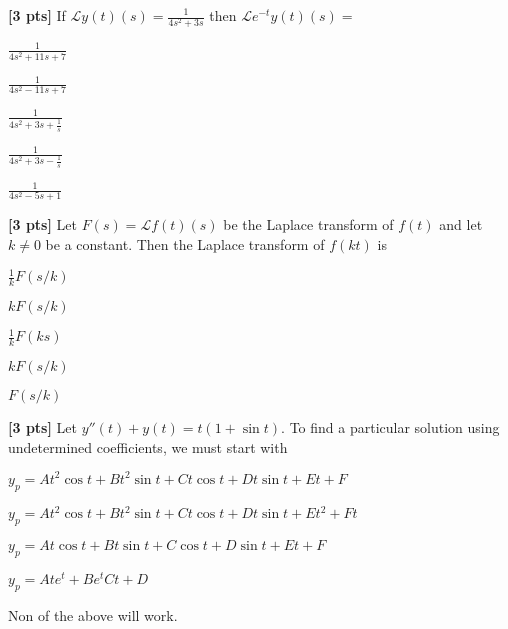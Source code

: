 \documentclass[11pt]{article}
\begin{document}
\begin{problem}
\textbf{[3 pts]} If $\mathcal{L}{y(t)}(s) = \frac{1}{4s^{2}+3s}$ then $\mathcal{L}{e^{-t}y(t)}(s)=$
\begin{multchoice}
     \item $\frac{1}{4s^{2}+11s+7}$
     \item $\frac{1}{4s^{2}-11s+7}$
     \item $\frac{1}{4s^{2}+3s+\frac{1}{s}}$
     \item $\frac{1}{4s^{2}+3s-\frac{1}{s}}$
     \item $\frac{1}{4s^{2}-5s+1}$
\end{multchoice}
\end{problem}



\begin{problem}
\textbf{[3 pts]} Let $F(s) = \mathcal{L}{f(t)}(s)$ be the Laplace transform of $f (t)$ and let $k \neq 0$ be a constant. Then the Laplace transform of $f (kt)$ is
\begin{multchoice}
     \item $\frac{1}{k}F(s/k)$
     \item $kF(s/k)$
     \item $\frac{1}{k}F(ks)$
     \item $k F(s/k)$
     \item $F(s/k)$
\end{multchoice}
\end{problem}



\begin{problem}
\textbf{[3 pts]} Let $y''(t)+y(t) = t(1+\sin t)$. To find a particular solution using undetermined coefficients,
we must start with
\begin{multchoice}
     \item $y _{p} = At ^{2} \cos t + Bt ^{2} \sin t + Ct \cos t + Dt \sin t + Et + F$
     \item $y _{p} = At ^{2} \cos t + Bt ^{2} \sin t + Ct \cos t + Dt \sin t + Et^{2} + Ft$
     \item $y _{p} = At \cos t + Bt \sin t + C \cos t + D \sin t + Et + F$
     \item $y _{p} = At e^{ t} + B e^{t} Ct  + D$
     \item Non of the above will work.
\end{multchoice}
\end{problem}
\end{document}
